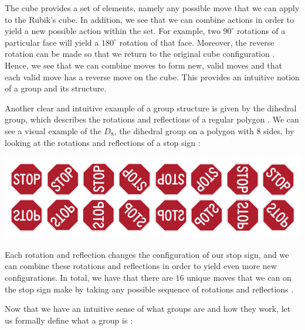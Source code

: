 \documentclass[11pt, reqno]{amsart}
\theoremstyle{plain}
\theoremstyle{definition}
\theoremstyle{example}
\begin{document}
\par
The cube provides a set of elements, namely any possible move that we can apply to the Rubik's cube. In addition, we see that we can combine actions in order to yield a new possible action within the set. For example, two $90^{\circ}$ rotations of a particular face will yield a $180^{\circ}$ rotation of that face. Moreover, the reverse rotation can be made so that we return to the original cube configuration \cite{carter}. Hence, we see that we can combine moves to form new, valid moves and that each valid move has a reverse move on the cube. This provides an intuitive notion of a group and its structure.

\par
Another clear and intuitive example of a group structure is given by the dihedral group, which describes the rotations and reflections of a regular polygon \cite{dummit, dihedralwiki}. We can see a visual example of the $D_8$, the dihedral group on a polygon with $8$ sides, by looking at the rotations and reflections of a stop sign \cite{dihedralwiki}:

\includegraphics[scale=0.65]{Dihedral8}

Each rotation and reflection changes the configuration of our stop sign, and we can combine these rotations and reflections in order to yield even more new configurations. In total, we have that there are $16$ unique moves that we can on the stop sign make by taking any possible sequence of rotations and reflections \cite{dihedralwiki}.

\newpage
\par
Now that we have an intuitive sense of what groups are and how they work, let us formally define what a group is \cite[\S 1.1, p. 16]{dummit}:
\end{document}
